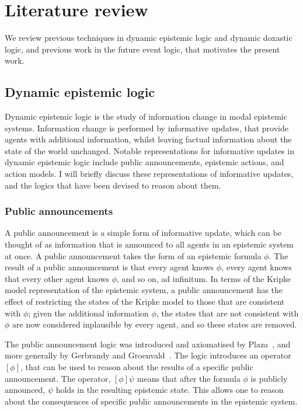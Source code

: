\chapter{Literature review}

We review previous techniques in dynamic epistemic logic and dynamic doxastic
logic, and previous work in the future event logic, that motivates the present
work.

\section{Dynamic epistemic logic}

Dynamic epistemic logic is the study of information change in modal epistemic
systems. Information change is performed by informative updates, that provide
agents with additional information, whilst leaving factual information about the
state of the world unchanged. Notable representations for informative updates
in dynamic epistemic logic include public announcements, epistemic actions, and
action models. I will briefly discuss these representations of informative
updates, and the logics that have been devised to reason about them.

\subsection*{Public announcements}

A public announcement is a simple form of informative update, which can be
thought of as information that is announced to all agents in an epistemic system
at once. A public announcement takes the form of an epistemic formula $\phi$.
The result of a public announcement is that every agent knows $\phi$, every
agent knows that every other agent knows $\phi$, and so on, ad infinitum. In
terms of the Kripke model representation of the epistemic system, a public
announcement has the effect of restricting the states of the Kripke model to
those that are consistent with $\phi$; given the additional information $\phi$,
the states that are not consistent with $\phi$ are now considered inplausible by
every agent, and so these states are removed.

The public announcement logic was introduced and axiomatised by
Plaza~\cite{plaza2007logics}, and more generally by Gerbrandy and
Groenvald~\cite{gerbrandy1997reasoning}. %
The logic introduces an operator $[\phi]$, that can be used to reason about the
results of a specific public announcement. The operator, $[\phi] \psi$ means
that after the formula $\phi$ is publicly announced, $\psi$ holds in the
resulting epistemic state. This allows one to reason about the consequences of
specific public announcements in the epistemic system.

